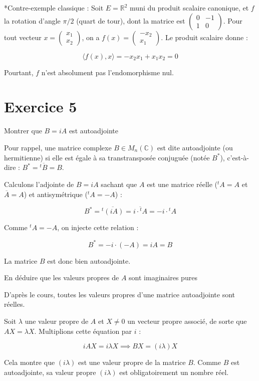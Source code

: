 \documentclass[french]{yLectureNote}
\begin{document}
*Contre-exemple classique : Soit $E = \mathbb{R}^2$ muni du produit scalaire canonique, et $f$ la rotation d'angle $\pi/2$ (quart de tour), dont la matrice est $\begin{pmatrix} 0 & -1 \\ 1 & 0 \end{pmatrix}$.
Pour tout vecteur $x = \begin{pmatrix} x_1 \\ x_2 \end{pmatrix}$, on a $f(x) = \begin{pmatrix} -x_2 \\ x_1 \end{pmatrix}$.
Le produit scalaire donne :


$$\langle f(x), x \rangle = -x_2 x_1 + x_1 x_2 = 0$$


Pourtant, $f$ n'est absolument pas l'endomorphisme nul.

\section{Exercice 5}

 Montrer que $B = iA$ est autoadjointe


Pour rappel, une matrice complexe $B \in M_n(\mathbb{C})$ est dite autoadjointe (ou hermitienne) si elle est égale à sa transtransposée conjuguée (notée $B^*$), c'est-à-dire : $B^* = \overline{{}^tB} = B$.


Calculons l'adjointe de $B = iA$ sachant que $A$ est une matrice réelle (${}^tA = A$ et $\overline{A} = A$) et antisymétrique (${}^tA = -A$) :


$$B^* = \overline{{}^t(iA)} = \overline{i \cdot {}^tA} = -i \cdot {}^tA$$


Comme ${}^tA = -A$, on injecte cette relation :


$$B^* = -i \cdot (-A) = iA = B$$

La matrice $B$ est donc bien autoadjointe.

 En déduire que les valeurs propres de $A$ sont imaginaires pures

D'après le cours, toutes les valeurs propres d'une matrice autoadjointe sont réelles.

Soit $\lambda$ une valeur propre de $A$ et $X \neq 0$ un vecteur propre associé, de sorte que $AX = \lambda X$.
Multiplions cette équation par $i$ :


$$iAX = i\lambda X \implies BX = (i\lambda) X$$

Cela montre que $(i\lambda)$ est une valeur propre de la matrice $B$. Comme $B$ est autoadjointe, sa valeur propre $(i\lambda)$ est obligatoirement un nombre réel.
\end{document}
